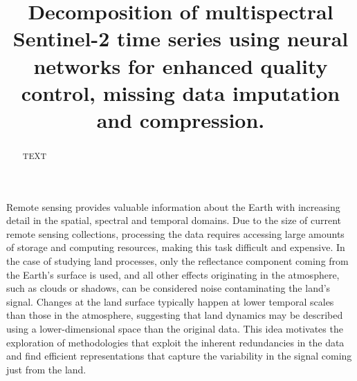 \documentclass[essd, manuscript]{copernicus}
\begin{document}
\title{Decomposition of multispectral Sentinel-2 time series using neural networks for enhanced quality control, missing data imputation and compression.}











\received{}
\pubdiscuss{} %
\revised{}
\accepted{}
\published{}



\maketitle

\begin{abstract}
TEXT
\end{abstract}


\introduction  %

Remote sensing provides valuable information about the Earth with increasing detail in the spatial, spectral and temporal domains. Due to the size of current remote sensing collections, processing the data requires accessing large amounts of storage and computing resources, making this task difficult and expensive. In the case of studying land processes, only the reflectance component coming from the Earth’s surface is used, and all other effects originating in the atmosphere, such as clouds or shadows, can be considered noise contaminating the land’s signal. Changes at the land surface typically happen at lower temporal scales than those in the atmosphere, suggesting that land dynamics may be described using a lower-dimensional space than the original data. This idea motivates the exploration of methodologies that exploit the inherent redundancies in the data and find efficient representations that capture the variability in the signal coming just from the land.
\end{document}
